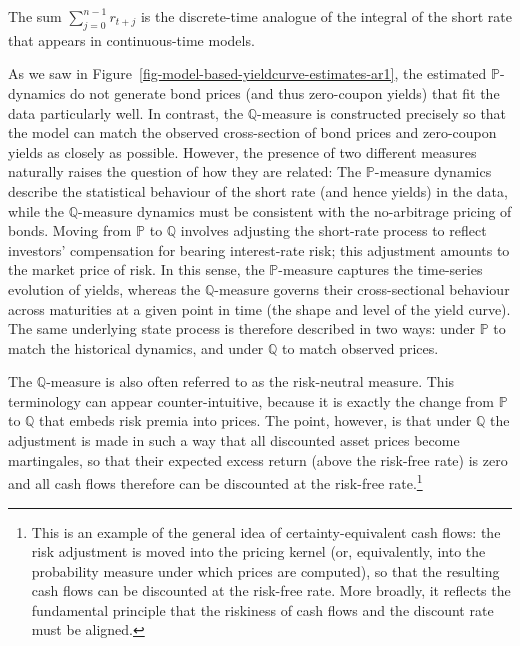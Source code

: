 \documentclass[
  letterpaper,
  DIV=11,
  numbers=noendperiod]{scrreprt}
\begin{document}
The sum \(\sum_{j=0}^{n-1} r_{t+j}\) is the discrete-time analogue of
the integral of the short rate that appears in continuous-time models.

As we saw in Figure~\ref{fig-model-based-yieldcurve-estimates-ar1}, the
estimated \(\mathbb{P}\)-dynamics do not generate bond prices (and thus
zero-coupon yields) that fit the data particularly well. In contrast,
the \(\mathbb{Q}\)-measure is constructed precisely so that the model
can match the observed cross-section of bond prices and zero-coupon
yields as closely as possible. However, the presence of two different
measures naturally raises the question of how they are related: The
\(\mathbb{P}\)-measure dynamics describe the statistical behaviour of
the short rate (and hence yields) in the data, while the
\(\mathbb{Q}\)-measure dynamics must be consistent with the no-arbitrage
pricing of bonds. Moving from \(\mathbb{P}\) to \(\mathbb{Q}\) involves
adjusting the short-rate process to reflect investors' compensation for
bearing interest-rate risk; this adjustment amounts to the market price
of risk. In this sense, the \(\mathbb{P}\)-measure captures the
time-series evolution of yields, whereas the \(\mathbb{Q}\)-measure
governs their cross-sectional behaviour across maturities at a given
point in time (the shape and level of the yield curve). The same
underlying state process is therefore described in two ways: under
\(\mathbb{P}\) to match the historical dynamics, and under
\(\mathbb{Q}\) to match observed prices.

The \(\mathbb{Q}\)-measure is also often referred to as the risk-neutral
measure. This terminology can appear counter-intuitive, because it is
exactly the change from \(\mathbb{P}\) to \(\mathbb{Q}\) that embeds
risk premia into prices. The point, however, is that under
\(\mathbb{Q}\) the adjustment is made in such a way that all discounted
asset prices become martingales, so that their expected excess return
(above the risk-free rate) is zero and all cash flows therefore can be
discounted at the risk-free rate.\footnote{This is an example of the
  general idea of certainty-equivalent cash flows: the risk adjustment
  is moved into the pricing kernel (or, equivalently, into the
  probability measure under which prices are computed), so that the
  resulting cash flows can be discounted at the risk-free rate. More
  broadly, it reflects the fundamental principle that the riskiness of
  cash flows and the discount rate must be aligned.}
\end{document}
